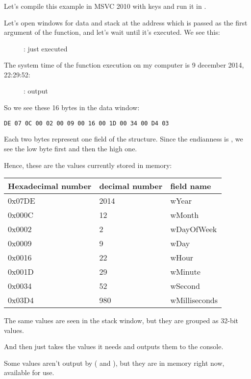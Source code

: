 ﻿\clearpage
\subsubsection{\olly}
\myindex{\olly}

Let's compile this example in MSVC 2010 with  keys and run it in \olly.

Let's open windows for data and stack at the address which is passed as the first argument of the
 function, and let's wait until it's executed. We see this:

\begin{figure}[H]
\centering
{}
\caption{\olly:  just executed}
\label{fig:struct_olly_1}
\end{figure}

The system time of the function execution on my computer is 9 december 2014, 22:29:52:

\begin{figure}[H]
\centering
{}
\caption{\olly: \printf output}
\label{fig:struct_olly_2}
\end{figure}

So we see these 16 bytes in the
data window: 
\begin{lstlisting}
DE 07 0C 00 02 00 09 00 16 00 1D 00 34 00 D4 03
\end{lstlisting}

Each two bytes represent one field of the structure. 
Since the \gls{endianness} is , 
we see the low byte first and then the high one.

Hence, these are the values currently stored in memory:

\begin{center}
\begin{tabular}{ | l | l | l | }
\hline
\headercolor{} Hexadecimal number & 
\headercolor{} decimal number & 
\headercolor{} field name \\
\hline
0x07DE & 2014	& wYear \\
\hline
0x000C & 12	& wMonth \\
\hline
0x0002 & 2	& wDayOfWeek \\
\hline
0x0009 & 9	& wDay \\
\hline
0x0016 & 22	& wHour \\
\hline
0x001D & 29	& wMinute \\
\hline
0x0034 & 52	& wSecond \\
\hline	
0x03D4 & 980	& wMilliseconds \\
\hline
\end{tabular}
\end{center}

The same values are seen in the stack window, but they are grouped as 32-bit values.

And then \printf just takes the values it needs and outputs them to the console.

Some values aren't output by \printf  ( and ), 
but they are in memory right now, available for use.

